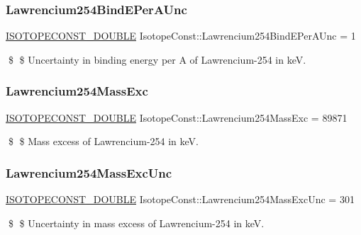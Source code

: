 \subsubsection{\texorpdfstring{Lawrencium254\+Bind\+E\+Per\+A\+Unc}{Lawrencium254BindEPerAUnc}}
{\footnotesize\ttfamily \mbox{\hyperlink{group___isotope_const-_macros_ga8f45a7272ce02c0b4c65c44636ed719a}{I\+S\+O\+T\+O\+P\+E\+C\+O\+N\+S\+T\+\_\+\+D\+O\+U\+B\+LE}} Isotope\+Const\+::\+Lawrencium254\+Bind\+E\+Per\+A\+Unc = 1}

\$ \$ Uncertainty in binding energy per A of Lawrencium-\/254 in keV. \mbox{\label{group___isotope_const-_lawrencium-_lr254_gab958e9f8b9de0fa476707f8f6c39fcf5}} 
\subsubsection{\texorpdfstring{Lawrencium254\+Mass\+Exc}{Lawrencium254MassExc}}
{\footnotesize\ttfamily \mbox{\hyperlink{group___isotope_const-_macros_ga8f45a7272ce02c0b4c65c44636ed719a}{I\+S\+O\+T\+O\+P\+E\+C\+O\+N\+S\+T\+\_\+\+D\+O\+U\+B\+LE}} Isotope\+Const\+::\+Lawrencium254\+Mass\+Exc = 89871}

\$ \$ Mass excess of Lawrencium-\/254 in keV. \mbox{\label{group___isotope_const-_lawrencium-_lr254_ga761b13d779e9bee58fd83b792cf619b6}} 
\subsubsection{\texorpdfstring{Lawrencium254\+Mass\+Exc\+Unc}{Lawrencium254MassExcUnc}}
{\footnotesize\ttfamily \mbox{\hyperlink{group___isotope_const-_macros_ga8f45a7272ce02c0b4c65c44636ed719a}{I\+S\+O\+T\+O\+P\+E\+C\+O\+N\+S\+T\+\_\+\+D\+O\+U\+B\+LE}} Isotope\+Const\+::\+Lawrencium254\+Mass\+Exc\+Unc = 301}

\$ \$ Uncertainty in mass excess of Lawrencium-\/254 in keV. \mbox{\label{group___isotope_const-_lawrencium-_lr254_gafd00b09987388176f9b967e3821e1641}} 
